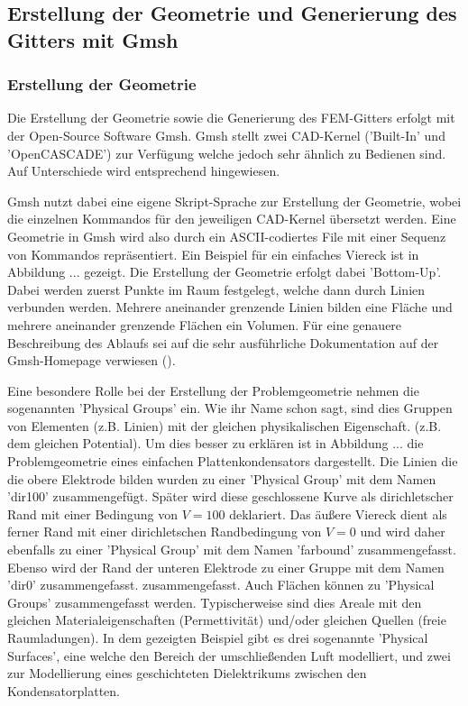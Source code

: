 \subsection{Erstellung der Geometrie und Generierung des Gitters mit Gmsh}
\subsubsection{Erstellung der Geometrie}
Die Erstellung der Geometrie sowie die Generierung des FEM-Gitters erfolgt mit der Open-Source Software Gmsh. \cite{gmsh_website}
Gmsh stellt zwei CAD-Kernel ('Built-In' und 'OpenCASCADE') zur Verfügung welche jedoch sehr ähnlich zu Bedienen sind. Auf Unterschiede wird entsprechend hingewiesen.\newline

Gmsh nutzt dabei eine eigene Skript-Sprache zur Erstellung der Geometrie, wobei die einzelnen Kommandos für den jeweiligen CAD-Kernel übersetzt werden. Eine Geometrie in Gmsh wird also durch ein ASCII-codiertes File mit einer Sequenz von Kommandos repräsentiert. Ein Beispiel für ein einfaches Viereck ist in Abbildung ... gezeigt. Die Erstellung der Geometrie erfolgt dabei 'Bottom-Up'. Dabei werden zuerst Punkte im Raum festgelegt, welche dann durch Linien verbunden werden. Mehrere aneinander grenzende Linien bilden eine Fläche und mehrere aneinander grenzende Flächen ein Volumen. Für eine genauere Beschreibung des Ablaufs sei auf die sehr ausführliche Dokumentation auf der Gmsh-Homepage verwiesen (\cite{gmsh_website}).\newline

Eine besondere Rolle bei der Erstellung der Problemgeometrie nehmen die sogenannten 'Physical Groups' ein. Wie ihr Name schon sagt, sind dies Gruppen von Elementen (z.B. Linien) mit der gleichen physikalischen Eigenschaft. (z.B. dem gleichen Potential). Um dies besser zu erklären ist in Abbildung ... die Problemgeometrie eines einfachen Plattenkondensators dargestellt. Die Linien die die obere Elektrode bilden wurden zu einer 'Physical Group' mit dem Namen 'dir100' zusammengefügt. Später wird diese geschlossene Kurve als dirichletscher Rand mit einer Bedingung von $V = 100$ deklariert. Das äußere Viereck dient als ferner Rand mit einer dirichletschen Randbedingung von $V=0$ und wird daher ebenfalls zu einer 'Physical Group' mit dem Namen 'farbound' zusammengefasst. Ebenso wird der Rand der unteren Elektrode zu einer Gruppe mit dem Namen 'dir0' zusammengefasst.
 zusammengefasst.\newline
 Auch Flächen können zu 'Physical Groups' zusammengefasst werden. Typischerweise sind dies Areale mit den gleichen Materialeigenschaften (Permettivität) und/oder gleichen Quellen (freie Raumladungen). In dem gezeigten Beispiel gibt es drei sogenannte 'Physical Surfaces', eine welche den Bereich der umschließenden Luft modelliert, und zwei zur Modellierung eines geschichteten Dielektrikums zwischen den Kondensatorplatten.
 
